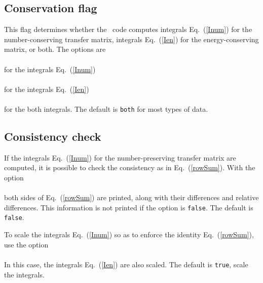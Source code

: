 \subsection{Conservation flag}\label{Sec:conserveFlag}
This flag determines whether the \gettransfer\ code computes integrals
   Eq.~(\ref{Inum}) for the number-conserving transfer matrix,
   integrals  Eq.~(\ref{Ien}) for the energy-conserving matrix, or both.
   The options are\\
   \\
for the integrals Eq.~(\ref{Inum})\\
   \\
for the integrals Eq.~(\ref{Ien})\\
   \\
for the both integrals.  The default is \texttt{both} for most types of data.

\subsection{Consistency check}
If the integrals Eq.~(\ref{Inum}) for the number-preserving transfer matrix
are computed, it is possible to check the consistency as in Eq.~(\ref{rowSum}).
With the option\\
  \\
both sides of Eq.~(\ref{rowSum}) are printed, along with their differences
and relative differences.  This information is not printed if the option is \texttt{false}.
The default is \texttt{false}.

To scale the integrals Eq.~(\ref{Inum}) so as to enforce the identity
Eq.~(\ref{rowSum}), use the option\\
  \\
In this case, the integrals Eq.~(\ref{Ien}) are also scaled.  The default
is \texttt{true}, scale the integrals.

